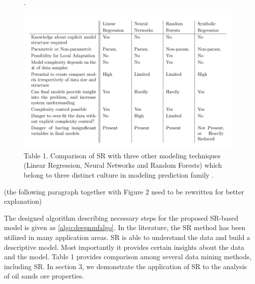 \documentclass[final,5p,times,twocolumn]{elsarticle}
\begin{document}
\begin{figure}[!htbp]
	\begin{center}
		\captionsetup{labelformat=empty}
		\caption*{Table 1. Comparison of SR with three other modeling techniques (Linear Regression, Neural Networks and Random Forests) which belong to three distinct culture in modeling prediction family \cite{vladislavleva2010knowledge}.}.
		
		\includegraphics[width=\linewidth]{SR_comparison.png}
	\end{center}
	\label{Table:SR_comparison}
\end{figure}

{\color{red}(the following paragraph together with Figure 2 need to be rewritten for better explanation)}

The designed algorithm describing necessary steps for the proposed SR-based model is given as \autoref{algo:deepnmfalgo}. In the literature, the SR method has been utilized in many application areas. SR is able to understand the data and build a descriptive model. Most importantly it provides certain insights about the data and the model. Table 1 provides comparison among several data mining methods, including SR. In section 3, we demonstrate the application of SR to the analysis of oil sands ore properties. 
\end{document}
